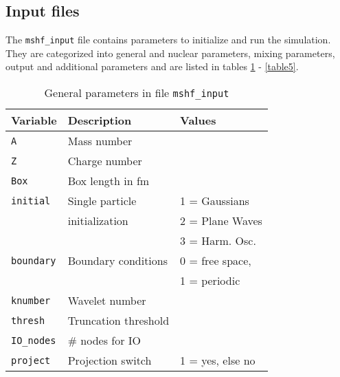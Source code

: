 \documentclass[3p]{elsarticle}
\begin{document}
\subsection{Input files}
The {\tt mshf\_input} file contains parameters to initialize and run the simulation. They are categorized into general and nuclear parameters, mixing parameters, output and additional parameters and are listed in tables \ref{table1} - \ref{table5}.
\begin{table}
\caption{General parameters in file \texttt{mshf\_input}}
\begin{tabular*}{\columnwidth}{ l l l}
\hline
\hline
Variable & Description & Values\\
\hline
\texttt{A}                   & Mass number                                                    & \\
\texttt{Z}                   & Charge number                                                 & \\
\texttt{Box}               & Box length in fm                       & \\
\texttt{initial}             & Single particle                    & 1 = Gaussians\\
                                 & initialization                                                                          & 2 = Plane Waves\\
                                 &                                   			                  & 3 = Harm. Osc.\\
\texttt{boundary}       & Boundary conditions            & 0 = free space,\\          
				& 						                  & 1 = periodic\\                        
\texttt{knumber}        & Wavelet number                                                & \\
\texttt{thresh}            & Truncation threshold                                     & \\
\texttt{IO\_nodes}     & \# nodes for IO                                     & \\
\texttt{project}           & Projection switch                   & 1 = yes, else no \\
\hline
\hline
\end{tabular*}
\label{table1}
\end{table}
\end{document}
